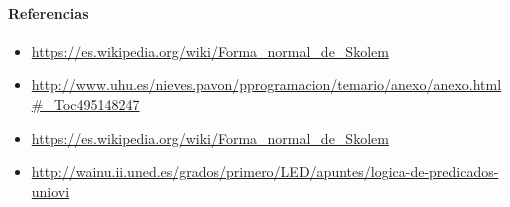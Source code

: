 \documentclass{article}
\begin{document}
\paragraph{Referencias} 

\begin{itemize}
\item \url{https://es.wikipedia.org/wiki/Forma_normal_de_Skolem}
\item \url{http://www.uhu.es/nieves.pavon/pprogramacion/temario/anexo/anexo.html#_Toc495148247}
\item \url{https://es.wikipedia.org/wiki/Forma_normal_de_Skolem}
\item \url{http://wainu.ii.uned.es/grados/primero/LED/apuntes/logica-de-predicados-uniovi}
\end{itemize}
\end{document}
